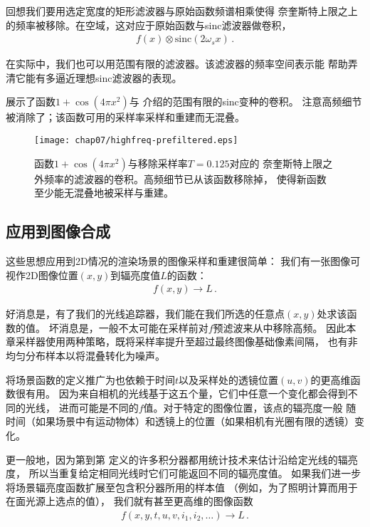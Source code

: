 回想我们要用选定宽度的矩形滤波器与原始函数频谱相乘使得
奈奎斯特上限之上的频率被移除。在空域，这对应于原始函数与sinc滤波器做卷积，
\begin{align*}
    f(x)\otimes \mathrm{sinc}(2\omega_sx)\, .
\end{align*}

在实际中，我们也可以用范围有限的滤波器。该滤波器的频率空间表示能
帮助弄清它能有多逼近理想sinc滤波器的表现。

展示了函数$1+\cos(4\pi x^2)$与
介绍的范围有限的sinc变种的卷积。
注意高频细节被消除了；该函数可用的采样率采样和重建而无混叠。
\begin{figure}[htbp]
    \centering\texttt{[image: chap07/highfreq-prefiltered.eps]}
    \caption{函数$1+\cos(4\pi x^2)$与移除采样率$T=0.125$对应的
        奈奎斯特上限之外频率的滤波器的卷积。高频细节已从该函数移除掉，
        使得新函数至少能无混叠地被采样与重建。}
    \label{fig:7.10}
\end{figure}

\subsection{应用到图像合成}\label{sub:应用到图像合成}
这些思想应用到2D情况的渲染场景的图像采样和重建很简单：
我们有一张图像可视作2D图像位置$(x,y)$到辐亮度值$L$的函数：
\begin{align*}
    f(x,y)\rightarrow L\, .
\end{align*}

好消息是，有了我们的光线追踪器，我们能在我们所选的任意点$(x,y)$处求该函数的值。
坏消息是，一般不太可能在采样前对$f$预滤波来从中移除高频。
因此本章采样器使用两种策略，既将采样率提升至超过最终图像基础像素间隔，
也有非均匀分布样本以将混叠转化为噪声。

将场景函数的定义推广为也依赖于时间$t$以及采样处的透镜位置$(u,v)$的更高维函数很有用。
因为来自相机的光线基于这五个量，它们中任意一个变化都会得到不同的光线，
进而可能是不同的$f$值。对于特定的图像位置，该点的辐亮度一般
随时间（如果场景中有运动物体）和透镜上的位置（如果相机有光圈有限的透镜）变化。

更一般地，因为第到第
定义的许多积分器都用统计技术来估计沿给定光线的辐亮度，
所以当重复给定相同光线时它们可能返回不同的辐亮度值。
如果我们进一步将场景辐亮度函数扩展至包含积分器所用的样本值
（例如，为了照明计算而用于在面光源上选点的值），
我们就有甚至更高维的图像函数
\begin{align*}
    f(x,y,t,u,v,i_1,i_2,\ldots)\rightarrow L\, .
\end{align*}

